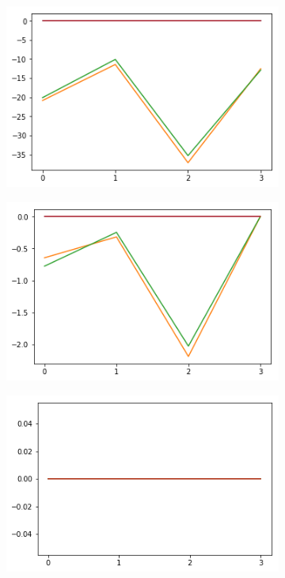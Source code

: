 \begin{figure}[h!]
  \begin{subfigure}[b]{0.3\linewidth}
    \includegraphics[width=\linewidth]{images/subst1/ef0_means_neg.png}
    \caption{}
  \end{subfigure}
  \begin{subfigure}[b]{0.3\linewidth}
    \includegraphics[width=\linewidth]{images/subst1/ef1_means_neg.png}
    \caption{}
  \end{subfigure}
  \begin{subfigure}[b]{0.3\linewidth}
    \includegraphics[width=\linewidth]{images/subst1/ef2_means_neg.png}
    \caption{}
  \end{subfigure}
    

\end{figure}
